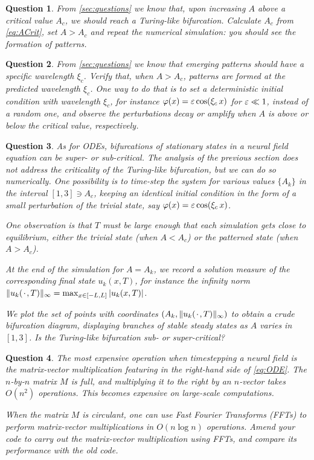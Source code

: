 \documentclass[a4paper]{siamonline220329}
\theoremstyle{plain}
\newtheorem{question}{Question}
\begin{document}
\begin{question} 
  From \cref{sec:questions} we know that, upon increasing $A$ above a critical value
  $A_c$, we should reach a Turing-like bifurcation. Calculate $A_c$ from
  \cref{eq:ACrit}, set $A > A_c$ and repeat the numerical simulation: you should see
  the formation of patterns.
\end{question}

\begin{question} 
  From \cref{sec:questions} we know that emerging patterns should have a specific wavelength
  $\xi_c$. Verify that, when $A > A_c$, patterns are formed at the predicted
  wavelength $\xi_c$. One way to do that is to set a deterministic initial condition with
  wavelength $\xi_c$, for instance $\varphi(x) = \varepsilon \cos(\xi_c\, x)$ for $\varepsilon \ll 1$, instead of a random
  one, and observe the perturbations decay or amplify when $A$ is above or below the
  critical value, respectively.
\end{question}

\begin{question} 
  As for ODEs, bifurcations of stationary states in a neural field equation can be
  super- or sub-critical. The analysis of the previous section does not address the
  criticality of the Turing-like bifurcation, but we can do so numerically. One
  possibility is to time-step the system for various values $\{A_k\}$ in the
  interval $[1,3] \ni A_c$, keeping an identical initial condition in the form of a small
  perturbation of the trivial state, say $\varphi(x) = \varepsilon \cos(\xi_c \, x)$. 

  One observation is that $T$ must be large enough that each simulation gets close to
  equilibrium, either the trivial state (when $A < A_c$) or the patterned state
  (when $A > A_c$).

  At the end of the simulation for $A = A_k$, we record a solution measure of the
  corresponding final state $u_k(x,T)$, for instance the infinity norm  $\|
  u_k({\mkern 2mu\cdot\mkern 2mu},T) \|_{\infty} = \max_{x \in [-L,L]} | u_k(x,T) |$. 

  We plot the set of points with coordinates $(A_k, \| u_k({\mkern 2mu\cdot\mkern 2mu}, T) \|_{\infty})$
  to obtain a crude bifurcation diagram, displaying branches of stable steady states
  as $A$ varies in $[1,3]$. Is the Turing-like bifurcation sub- or super-critical?
\end{question}

\begin{question}
  The most expensive operation when timestepping a neural field is the matrix-vector
  multiplication featuring in the right-hand side of \cref{eq:ODE}. The $n$-by-$n$
  matrix $M$ is full, and multiplying it to the right by an $n$-vector takes $O(n^2)$
  operations. This becomes expensive on large-scale computations.

  When the matrix $M$ is circulant, one can use Fast Fourier Transforms (FFTs) to perform
  matrix-vector multiplications in $O(n \log n)$ operations. Amend your code to carry
  out the matrix-vector multiplication using FFTs, and compare its performance with
  the old code.
\end{question}


% 
% 
\end{document}
